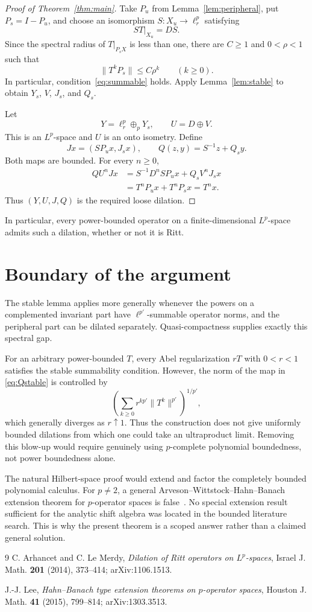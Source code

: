 \documentclass[11pt]{article}
\begin{document}
\begin{proof}[Proof of Theorem~\ref{thm:main}]
Take $P_u$ from Lemma~\ref{lem:peripheral}, put $P_s=I-P_u$, and choose an
isomorphism $S:X_u\to\ell^p_r$ satisfying
\[
 ST|_{X_u}=DS.
\]
Since the spectral radius of $T|_{P_sX}$ is less than one, there are
$C\ge1$ and $0<\rho<1$ such that
\[
 \|T^kP_s\|\le C\rho^k\qquad(k\ge0).
\]
In particular, condition~\eqref{eq:summable} holds.  Apply
Lemma~\ref{lem:stable} to obtain $Y_s$, $V$, $J_s$, and $Q_s$.

Let
\[
 Y=\ell^p_r\oplus_pY_s,
 \qquad U=D\oplus V.
\]
This is an $L^p$-space and $U$ is an onto isometry.  Define
\[
 Jx=(SP_ux,J_sx),
 \qquad
 Q(z,y)=S^{-1}z+Q_sy.
\]
Both maps are bounded.  For every $n\ge0$,
\begin{align*}
 QU^nJx
 &=S^{-1}D^nSP_ux+Q_sV^nJ_sx\\
 &=T^nP_ux+T^nP_sx=T^nx.
\end{align*}
Thus $(Y,U,J,Q)$ is the required loose dilation.
\end{proof}

In particular, every power-bounded operator on a finite-dimensional
$L^p$-space admits such a dilation, whether or not it is Ritt.

\section{Boundary of the argument}

The stable lemma applies more generally whenever the powers on a complemented
invariant part have $\ell^{p'}$-summable operator norms, and the peripheral
part can be dilated separately.  Quasi-compactness supplies exactly this
spectral gap.

For an arbitrary power-bounded $T$, every Abel regularization $rT$ with
$0<r<1$ satisfies the stable summability condition.  However, the norm of
the map in \eqref{eq:Qstable} is controlled by
\[
 \left(\sum_{k\ge0}r^{kp'}\|T^k\|^{p'}\right)^{1/p'},
\]
which generally diverges as $r\uparrow1$.  Thus the construction does not
give uniformly bounded dilations from which one could take an ultraproduct
limit.  Removing this blow-up would require genuinely using
$p$-complete polynomial boundedness, not power boundedness alone.

The natural Hilbert-space proof would extend and factor the completely
bounded polynomial calculus.  For $p\ne2$, a general
Arveson--Wittstock--Hahn--Banach extension theorem for $p$-operator spaces is
false~\cite{Lee}.  No special extension result sufficient for the analytic
shift algebra was located in the bounded literature search.  This is why the
present theorem is a scoped answer rather than a claimed general solution.

\begin{thebibliography}{9}
C. Arhancet and C. Le Merdy,
\emph{Dilation of Ritt operators on $L^p$-spaces},
Israel J. Math. \textbf{201} (2014), 373--414;
arXiv:1106.1513.

J.-J. Lee,
\emph{Hahn--Banach type extension theorems on $p$-operator spaces},
Houston J. Math. \textbf{41} (2015), 799--814;
arXiv:1303.3513.
\end{thebibliography}
\end{document}
